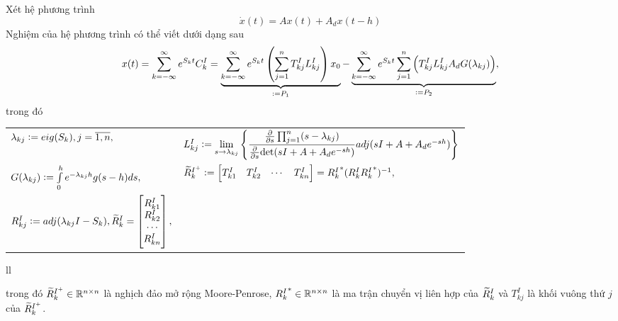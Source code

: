 \documentclass[10pt]{beamer}
\begin{document}
	\scriptsize{
		\begin{frame}
			Xét hệ phương trình 
			\begin{equation*}
				\dot{x}(t) = Ax(t) + A_dx(t-h)
			\end{equation*}
			Nghiệm của hệ phương trình có thể viết dưới dạng sau
			\begin{align*}\label{ct3.2.1}
				x(t) = \sum_{k = -\infty}^{\infty} e^{S_kt}C_k^I
				=\underbrace{\sum_{k = -\infty}^{\infty} e^{S_k t} \left( \sum_{j=1}^{n} T^I_{kj} L^I_{kj} \right)x_0}_{:= P_1} - \underbrace{\sum_{k = -\infty}^{\infty} e^{S_k t} \sum_{j=1}^{n} \left(T^I_{kj} L^I_{kj} A_d G(\lambda_{kj}) \right)}_{:=P_2},
			\end{align*}
			trong đó
			\begin{tabular}{ll}
				$\lambda_{kj} :=eig(S_k), j = \overline{1,n},$ & $L^I_{kj} := \lim\limits_{s\to \lambda_{kj}}	\left\{ \dfrac{\frac{\partial }{\partial s} \prod_{j=1}^{n} (s - \lambda_{kj})}{\frac{\partial }{\partial s} \text{det} (s I + A + A_d e^{-sh})} adj(s I + A + A_d e^{-sh}) \right\}$ \\
				$G(\lambda_{kj}):= \int \limits^h_0 e^{-\lambda_{kj}h } g(s - h) ds,$ & $\widetilde{R}^{I^+}_k := \begin{bmatrix}
					T_{k1}^I & T_{k2}^I & \cdots & T_{kn}^I
				\end{bmatrix} = {R^I_k}^*(R^I_k {R^I_k}^*)^{-1},$\\
				$R_{kj}^I := adj (\lambda_{kj}I - S_k), \widetilde{R}_k^I = \begin{bmatrix} R^I_{k1} \\R^I_{k2} \\  \cdots \\R^I_{kn}  \end{bmatrix},$
			\end{tabular}{ll}
			
			trong đó $\widetilde{R}_k^{I^+} \in \mathbb{R}^{n\times n}$ là nghịch đảo mở rộng Moore-Penrose, ${R^I_k}^* \in \mathbb{R}^{n\times n}$ là ma trận chuyển vị liên hợp của $\widetilde{R}^I_k$ và $T_{kj}^I$ là khối vuông thứ $j$ của $\widetilde{R}_k^{I^+}$.
		\end{frame}
	}
	
\end{document}
